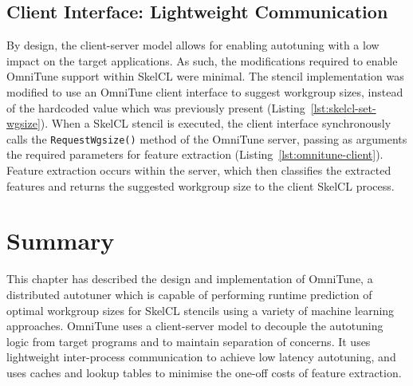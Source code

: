 \subsection{Client Interface: Lightweight Communication}

By design, the client-server model allows for enabling autotuning with
a low impact on the target applications. As such, the modifications
required to enable OmniTune support within SkelCL were minimal. The
stencil implementation was modified to use an OmniTune client
interface to suggest workgroup sizes, instead of the hardcoded value
which was previously present
(Listing~\ref{lst:skelcl-set-wgsize}). When a SkelCL stencil is
executed, the client interface synchronously calls the
\texttt{RequestWgsize()} method of the OmniTune server, passing as
arguments the required parameters for feature extraction
(Listing~\ref{lst:omnitune-client}). Feature extraction occurs within
the server, which then classifies the extracted features and returns
the suggested workgroup size to the client SkelCL process.







\section{Summary}

This chapter has described the design and implementation of OmniTune,
a distributed autotuner which is capable of performing runtime
prediction of optimal workgroup sizes for SkelCL stencils using a
variety of machine learning approaches. OmniTune uses a client-server
model to decouple the autotuning logic from target programs and to
maintain separation of concerns. It uses lightweight inter-process
communication to achieve low latency autotuning, and uses caches and
lookup tables to minimise the one-off costs of feature
extraction. 

